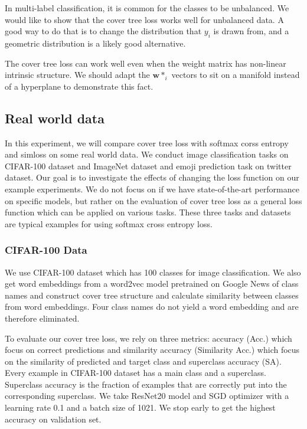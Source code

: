 \documentclass[twoside]{article}
\theoremstyle{definition}
\newcommand{\w}{\mathbf w}
\newcommand{\fixme}[1]{\noindent{\color{red}\textbf{FIXME:}  {#1}}}
\begin{document}
In multi-label classification, it is common for the classes to be unbalanced.
We would like to show that the cover tree loss works well for unbalanced data.
A good way to do that is to change the distribution that $y_i$ is drawn from,
and a geometric distribution is a likely good alternative.

The cover tree loss can work well even when the weight matrix has non-linear intrinsic structure.
We should adapt the $\w*_i$ vectors to sit on a manifold instead of a hyperplane to demonstrate this fact.


\subsection{Real world data}
In this experiment, we will compare cover tree loss with softmax corss entropy and simloss on some real world data.
We conduct image classification tasks on CIFAR-100 dataset and ImageNet dataset and emoji prediction task on twitter dataset.
Our goal is to investigate the effects of changing the loss function on our example experiments.
We do not focus on if we have state-of-the-art performance on specific models, but rather on the evaluation of cover tree loss as a general loss function which can be applied on various tasks.
These three tasks and datasets are typical examples for using softmax cross entropy loss.

\subsubsection{CIFAR-100 Data}
We use CIFAR-100 dataset which has 100 classes for image classification.
We also get word embeddings from a word2vec model pretrained on Google News \cite{Mikolov2013EfficientEO} of class names and construct cover tree structure and calculate similarity between classes from word embeddings.
Four class names do not yield a word embedding and are therefore eliminated.

To evaluate our cover tree loss, we rely on three metrics: accuracy (Acc.) which focus on correct predictions and similarity accuracy (Similarity Acc.) which focus on the similarity of predicted and target class and superclass accuracy (SA). Every example in CIFAR-100 dataset has a main class and a superclass. Superclass accuracy is the fraction of examples that are correctly put into the corresponding superclass.
We take ResNet20 model \cite{He2016DeepRL} and SGD optimizer with a learning rate 0.1 and a batch size of 1021. 
We stop early to get the highest accuracy on validation set.
\end{document}
